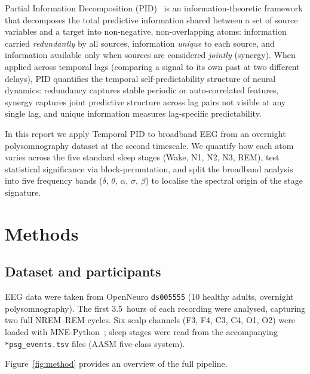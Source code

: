 \documentclass[11pt,a4paper]{article}
\begin{document}
Partial Information Decomposition (PID)~\citep{williams2010nonnegative} is an
information-theoretic framework that decomposes the total predictive
information shared between a set of source variables and a target into
non-negative, non-overlapping atoms: information carried \emph{redundantly} by
all sources, information \emph{unique} to each source, and information
available only when sources are considered \emph{jointly} (synergy).  When
applied across temporal lags (comparing a signal to its own past at two
different delays), PID quantifies the temporal self-predictability structure
of neural dynamics: redundancy captures stable periodic or auto-correlated
features, synergy captures joint predictive structure across lag pairs not
visible at any single lag, and unique information measures lag-specific
predictability.

In this report we apply Temporal PID to broadband EEG from an overnight
polysomnography dataset at the second timescale.  We quantify how each atom
varies across the five standard sleep stages (Wake, N1, N2, N3, REM), test
statistical significance via block-permutation, and split the broadband
analysis into five frequency bands ($\delta$, $\theta$, $\alpha$, $\sigma$,
$\beta$) to localise the spectral origin of the stage signature.

\section{Methods}

\subsection{Dataset and participants}

EEG data were taken from OpenNeuro \texttt{ds005555} (10 healthy adults,
overnight polysomnography).  The first 3.5~hours of each recording were
analysed, capturing two full NREM--REM cycles.  Six scalp channels (F3, F4,
C3, C4, O1, O2) were loaded with MNE-Python~\citep{gramfort2013meg}; sleep
stages were read from the accompanying \texttt{*psg\_events.tsv} files (AASM
five-class system).

Figure~\ref{fig:method} provides an overview of the full pipeline.
\end{document}
